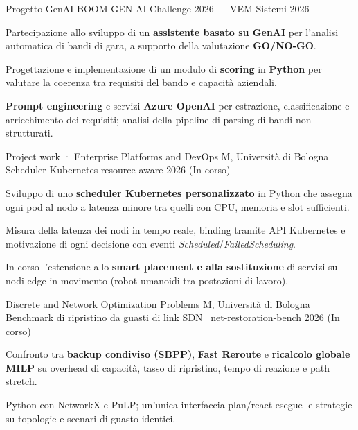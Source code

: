 \documentclass[11pt, a4paper]{../awesome-cv}
\begin{document}
\begin{cventries}
  \cventry
    {Progetto GenAI}
    {BOOM GEN AI Challenge 2026 — VEM Sistemi}
    {}
    {2026}
    {
      \begin{cvitems}
        \item {Partecipazione allo sviluppo di un \textbf{assistente basato su GenAI} per l'analisi automatica di bandi di gara, a supporto della valutazione \textbf{GO/NO-GO}.}
        \item {Progettazione e implementazione di un modulo di \textbf{scoring} in \textbf{Python} per valutare la coerenza tra requisiti del bando e capacità aziendali.}
        \item {\textbf{Prompt engineering} e servizi \textbf{Azure OpenAI} per estrazione, classificazione e arricchimento dei requisiti; analisi della pipeline di parsing di bandi non strutturati.}
      \end{cvitems}
    }

  \cventry
    {Project work · Enterprise Platforms and DevOps M, Università di Bologna}
    {Scheduler Kubernetes resource-aware}
    {}
    {2026 (In corso)}
    {
      \begin{cvitems}
        \item {Sviluppo di uno \textbf{scheduler Kubernetes personalizzato} in Python che assegna ogni pod al nodo a latenza minore tra quelli con CPU, memoria e slot sufficienti.}
        \item {Misura della latenza dei nodi in tempo reale, binding tramite API Kubernetes e motivazione di ogni decisione con eventi \textit{Scheduled}/\textit{FailedScheduling}.}
        \item {In corso l'estensione allo \textbf{smart placement e alla sostituzione} di servizi su nodi edge in movimento (robot umanoidi tra postazioni di lavoro).}
      \end{cvitems}
    }

  \cventry
    {Discrete and Network Optimization Problems M, Università di Bologna}
    {Benchmark di ripristino da guasti di link SDN}
    {\href{https://github.com/frigori/net-restoration-bench}{\faGithub\ net-restoration-bench}}
    {2026 (In corso)}
    {
      \begin{cvitems}
        \item {Confronto tra \textbf{backup condiviso (SBPP)}, \textbf{Fast Reroute} e \textbf{ricalcolo globale MILP} su overhead di capacità, tasso di ripristino, tempo di reazione e path stretch.}
        \item {Python con NetworkX e PuLP; un'unica interfaccia plan/react esegue le strategie su topologie e scenari di guasto identici.}
      \end{cvitems}
    }


\end{cventries}
\end{document}
